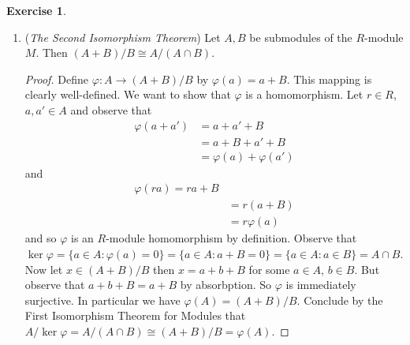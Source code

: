 \documentclass[8pt]{amsart}
\theoremstyle{plain}%
\theoremstyle{definition}
\newtheorem{exercise}{Exercise}[section]
\theoremstyle{remark}
\numberwithin{equation}{section}
\begin{document}
\begin{exercise}
\begin{enumerate}
\begin{proof}
				Now we must show that $\Phi$ is an $R$-module homomorphism. Let $x, y \in M/\ker\varphi$ where $x = m + \ker\varphi$ and $y = m' + \ker\varphi$ for some $m, m' \in M$ and let $r \in R$. Observe that
				\begin{align*}
					\Phi(x + y)&= \Phi(m + m' + \ker\varphi)\\
					&= \varphi(m + m')\\
					&= \varphi(m) + \varphi(m')\\
					&= \Phi(m + \ker\varphi) + \Phi(m' + \ker\varphi)\\
					&= \Phi(x) + \Phi(y)
				\end{align*}
				and
				\begin{align*}
					\Phi(rx) &= \Phi(r(m + \ker\varphi))\\
					&= \Phi(rm + \ker\varphi)\\ %
					&= \varphi(rm)\\
					&= r\varphi(m)\\
					&= r\Phi(m + \ker\varphi)\\
					&= r\Phi(x)
				\end{align*}
				Hence we have shown that $\Phi$ is a well-defined bijective homomorphism and thus we can conclude by definition of $R$-module isomorphism that $M/\ker\varphi \cong \varphi(M)$.
			\end{proof}
		\item (\textit{The Second Isomorphism Theorem}) Let $A, B$ be submodules of the $R$-module $M$. Then $(A + B)/B \cong A/(A \cap B)$.
			\begin{proof}
				Define $\varphi : A \to (A + B)/B$ by $\varphi(a) = a + B$. This mapping is clearly well-defined. We want to show that $\varphi$ is a homomorphism. Let $r \in R$, $a, a' \in A$ and observe that
					\begin{align*}
						\varphi(a + a') &= a + a' + B\\
						&= a + B + a' + B\\
						&= \varphi(a) + \varphi(a')
					\end{align*}
					and
					\begin{align*}
						\varphi(ra) = ra + B\\
						&= r(a + B)\\
						&= r\varphi(a)
					\end{align*}
					and so $\varphi$ is an $R$-module homomorphism by definition. Observe that $\ker \varphi = \{a \in A : \varphi(a) = 0\} = \{a \in A : a + B = 0\} = \{a \in A : a \in B\} = A \cap B$. Now let $x \in (A + B)/B$ then $x = a + b + B$ for some $a \in A$, $b \in B$. But observe that $a + b + B = a + B$ by absorbption. So $\varphi$ is immediately surjective. In particular we have $\varphi(A) = (A + B)/B$. Conclude by the First Isomorphism Theorem for Modules that $A/\ker \varphi = A/(A \cap B) \cong (A + B)/B = \varphi(A)$.

\end{proof}
\end{enumerate}
\end{exercise}
\end{document}
